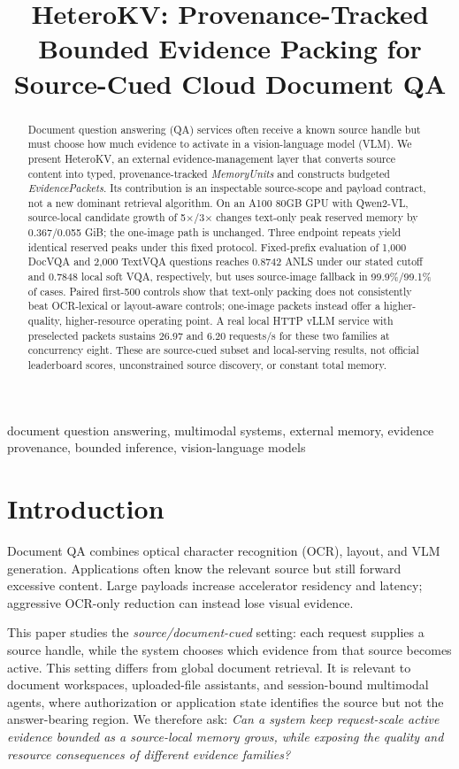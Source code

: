 ﻿\documentclass[conference]{IEEEtran}
\title{HeteroKV: Provenance-Tracked Bounded Evidence Packing for Source-Cued Cloud Document QA}
\author{
\IEEEauthorblockN{Haoran An\IEEEauthorrefmark{1}, Qide Mao\IEEEauthorrefmark{1}, and Yuzhong Cao\IEEEauthorrefmark{2}\thanks{Corresponding author: Yuzhong Cao.}}
\IEEEauthorblockA{\IEEEauthorrefmark{1}Beijing City University, Beijing, China\\
Email: ahr123456@bcu.edu.cn; penguinsama8@gmail.com}
\IEEEauthorblockA{\IEEEauthorrefmark{2}Peking University, Beijing, China\\
Email: caoyuzhong@pku.edu.cn}
}
\newcommand{\system}{HeteroKV\xspace}
\begin{document}
\maketitle

\begin{abstract}
Document question answering (QA) services often receive a known source handle but must choose how much evidence to activate in a vision-language model (VLM). We present \system, an external evidence-management layer that converts source content into typed, provenance-tracked \emph{MemoryUnits} and constructs budgeted \emph{EvidencePackets}. Its contribution is an inspectable source-scope and payload contract, not a new dominant retrieval algorithm. On an A100 80GB GPU with Qwen2-VL, source-local candidate growth of 5$\times$/3$\times$ changes text-only peak reserved memory by 0.367/0.055 GiB; the one-image path is unchanged. Three endpoint repeats yield identical reserved peaks under this fixed protocol. Fixed-prefix evaluation of 1,000 DocVQA and 2,000 TextVQA questions reaches 0.8742 ANLS under our stated cutoff and 0.7848 local soft VQA, respectively, but uses source-image fallback in 99.9\%/99.1\% of cases. Paired first-500 controls show that text-only packing does not consistently beat OCR-lexical or layout-aware controls; one-image packets instead offer a higher-quality, higher-resource operating point. A real local HTTP vLLM service with preselected packets sustains 26.97 and 6.20 requests/s for these two families at concurrency eight. These are source-cued subset and local-serving results, not official leaderboard scores, unconstrained source discovery, or constant total memory.
\end{abstract}

\begin{IEEEkeywords}
document question answering, multimodal systems, external memory, evidence provenance, bounded inference, vision-language models
\end{IEEEkeywords}

\section{Introduction}
Document QA combines optical character recognition (OCR), layout, and VLM generation. Applications often know the relevant source but still forward excessive content. Large payloads increase accelerator residency and latency; aggressive OCR-only reduction can instead lose visual evidence.

This paper studies the \emph{source/document-cued} setting: each request supplies a source handle, while the system chooses which evidence from that source becomes active. This setting differs from global document retrieval. It is relevant to document workspaces, uploaded-file assistants, and session-bound multimodal agents, where authorization or application state identifies the source but not the answer-bearing region. We therefore ask: \emph{Can a system keep request-scale active evidence bounded as a source-local memory grows, while exposing the quality and resource consequences of different evidence families?}
\end{document}
